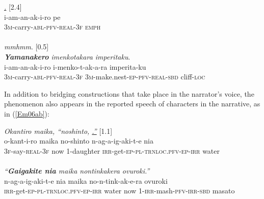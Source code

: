 \documentclass[output=paper]{LSP/langsci}
\begin{document}
\begin{exe}
\ex \label{Em05ab}
\begin{xlist}
\ex \label{Emex:05a}
\glt \textit{\underline{.} } [2.4]\\
\gll i-am-an-ak-i-ro pe\\
 \textsc{3m-}carry\textsc{-abl-pfv-real-3f} \textsc{emph}\\
\glt {}\\
\ex \label{Emex:05b}
\glt \textit{mmhmm}. [0.5]\\
\ex \label{Emex:05c}
\glt \textit{\textbf{Yamanakero} imenkotakara imperitaku}.\\
\gll i-am-an-ak-i-ro i-menko-t-ak-a-ra imperita-ku \\     	      
   \textsc{3m-}carry\textsc{-abl-pfv-real-3f} \textsc{3m-}make.nest\textsc{-ep-pfv-real-sbd} cliff\textsc{-loc}\\
\glt {}
\end{xlist}
\end{exe}



In addition to bridging constructions that take place in the narrator’s voice, the phenomenon also appears in the reported speech of characters in the narrative, as in (\ref{Em06ab}): 

\begin{exe}
\ex \label{Em06ab}
\begin{xlist}
\ex \label{Emex:06a}
\glt \textit{Okantiro maika, ``noshinto, \underline{.''}} [1.1]\\
\gll o-kant-i-ro maika no-shinto n-ag-a-ig-aki-t-e nia \\
 \textsc{3f-}say\textsc{-real-3f} now \textsc{1-}daughter \textsc{irr-}get\textsc{-ep-pl-trnloc.pfv-ep-irr} water\\
\glt {}\\
\ex \label{Emex:06b}
\glt \textit{``\textbf{Gaigakite nia} maika nontinkakera ovuroki.''}\\
\gll n-ag-a-ig-aki-t-e nia maika no-n-tink-ak-e-ra ovuroki\\     	      
   \textsc{irr-}get\textsc{-ep-pl-trnloc.pfv-ep-irr} water now \textsc{1-irr-}mash\textsc{-pfv-irr-sbd} masato\\
\glt {}
\end{xlist}
\end{exe}
\end{document}
